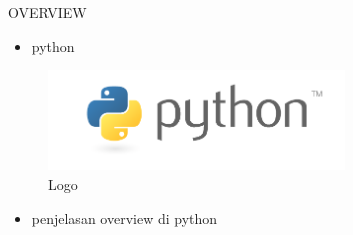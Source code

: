 
\sloppy
\begin{center}{\fontsize{14pt}{14pt}\selectfont OVERVIEW \\}\end{center} \par

\begin{itemize}
	\item python
\end{itemize}
\begin{figure}[ht]
	\centerline{\includegraphics[width=0.70\textwidth]{figures/python}}
	\caption{Logo}
	\label{Logo}
\end{figure}

\begin{itemize}
	\item penjelasan overview di python
\end{itemize}

